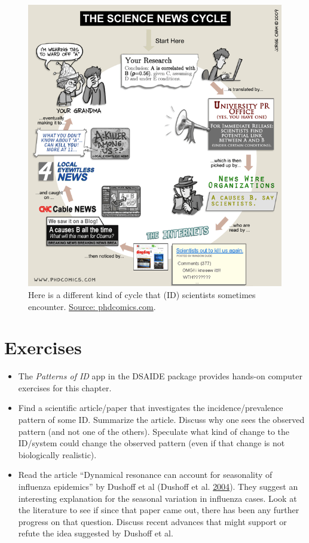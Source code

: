\documentclass[]{book}
\providecommand{\tightlist}{%
  \setlength{\itemsep}{0pt}\setlength{\parskip}{0pt}}
\theoremstyle{definition}
\theoremstyle{definition}
\theoremstyle{definition}
\theoremstyle{remark}
\begin{document}
\begin{figure}
\centering
\includegraphics{./images/phd_sciencenewscycle.png}
\caption{\label{fig:sciencenewscycle}Here is a different kind of cycle that
(ID) scientists sometimes encounter.
\href{http://www.phdcomics.com/comics/archive.php?comicid=1174}{Source:
phdcomics.com}.}
\end{figure}

\section{Exercises}\label{exercises-2}

\begin{itemize}
\tightlist
\item
  The \emph{Patterns of ID} app in the DSAIDE package provides hands-on
  computer exercises for this chapter.
\item
  Find a scientific article/paper that investigates the
  incidence/prevalence pattern of some ID. Summarize the article.
  Discuss why one sees the observed pattern (and not one of the others).
  Speculate what kind of change to the ID/system could change the
  observed pattern (even if that change is not biologically realistic).
\item
  Read the article ``Dynamical resonance can account for seasonality of
  influenza epidemics'' by Dushoff et al (Dushoff et al.
  \protect\hyperlink{ref-dushoff04}{2004}). They suggest an interesting
  explanation for the seasonal variation in influenza cases. Look at the
  literature to see if since that paper came out, there has been any
  further progress on that question. Discuss recent advances that might
  support or refute the idea suggested by Dushoff et al.
\end{itemize}
\end{document}
